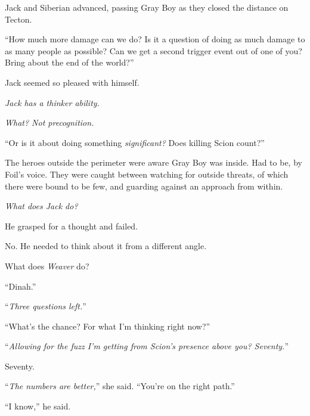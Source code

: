 Jack and Siberian advanced, passing Gray Boy as they closed the distance on Tecton.



``How much more damage can we do?  Is it a question of doing as much damage to as many people as possible?  Can we get a second trigger event out of one of you?  Bring about the end of the world?''



Jack seemed so pleased with himself.



\emph{Jack has a thinker ability.  }



\emph{What?  Not precognition.}



``Or is it about doing something \emph{significant?  }Does killing Scion count?''



The heroes outside the perimeter were aware Gray Boy was inside.  Had to be, by Foil's voice.  They were caught between watching for outside threats, of which there were bound to be few, and guarding against an approach from within.



\emph{What does Jack do?}



He grasped for a thought and failed.



No.  He needed to think about it from a different angle.



What does \emph{Weaver} do?



``Dinah.''



``\emph{Three questions left.}''



``What's the chance?  For what I'm thinking right now?''



``\emph{Allowing for the fuzz I'm getting from Scion's presence above you?  Seventy.}''



Seventy.



``\emph{The numbers are better,}'' she said.  ``You're on the right path.''



``I know,'' he said.



